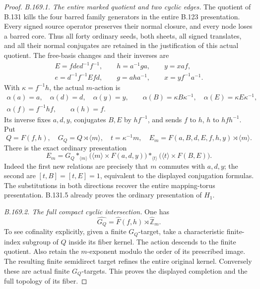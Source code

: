 \begin{proof}
\emph{B.169.1. The entire marked quotient and two cyclic edges.}
The quotient of B.131 kills the four barred family generators in the
entire B.123 presentation. Every signed source operator preserves their
normal closure, and every node loses a barred core. Thus all forty
ordinary seeds, both sheets, all signed translates, and all their normal
conjugates are retained in the justification of this actual quotient.
The free-basis changes and their inverses are
\[
 \begin{gathered}
 E=fde d^{-1}f^{-1},\qquad h=a^{-1}ga,\qquad y=xaf,\\
 e=d^{-1}f^{-1}Efd,\qquad g=aha^{-1},\qquad x=yf^{-1}a^{-1}.
 \end{gathered}
\]
With \(\kappa=f^{-1}h\), the actual \(m\)-action is
\[
 \begin{gathered}
 \alpha(a)=a,\quad\alpha(d)=d,\quad\alpha(y)=y,\qquad
 \alpha(B)=\kappa B\kappa^{-1},\quad
 \alpha(E)=\kappa E\kappa^{-1},\\
 \alpha(f)=f^{-1}hf,\qquad\alpha(h)=f.
 \end{gathered}
\]
Its inverse fixes \(a,d,y\), conjugates \(B,E\) by \(hf^{-1}\),
and sends \(f\) to \(h\), \(h\) to \(hfh^{-1}\).
Put
\[
 Q=F(f,h),\quad G_Q=Q\rtimes\langle m\rangle,\quad
 t=\kappa^{-1}m,\quad E_m=F(a,B,d,E,f,h,y)\rtimes\langle m\rangle.
\]
There is the exact ordinary presentation
\begin{equation}\label{eq:B169-two-edges}
 E_m=G_Q*_{\langle m\rangle}
       \bigl(\langle m\rangle\times F(a,d,y)\bigr)
       *_{\langle t\rangle}
       \bigl(\langle t\rangle\times F(B,E)\bigr).
\end{equation}
Indeed the first new relations are precisely that \(m\) commutes with
\(a,d,y\); the second are \([t,B]=[t,E]=1\), equivalent to the
displayed conjugation formulas. The substitutions in both directions
recover the entire mapping-torus presentation. B.131.5 already proves
the ordinary presentation of \(H_1\).

\emph{B.169.2. The full compact cyclic intersection.}
One has
\[
 \widehat{G_Q}=\widehat F(f,h)\rtimes\widehat{\mathbb Z}_m.
 \tag{B.169.1}
\]
To see cofinality explicitly, given a finite \(G_Q\)-target, take a
characteristic finite-index subgroup of \(Q\) inside its fiber kernel.
The action descends to the finite quotient. Also retain the \(m\)-exponent
modulo the order of its prescribed image. The resulting finite
semidirect target refines the entire original kernel. Conversely these
are actual finite \(G_Q\)-targets. This proves the displayed completion
and the full topology of its fiber.


\end{proof}
